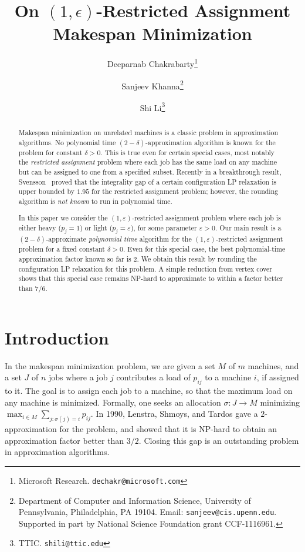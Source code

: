 \documentclass[11pt]{article}
\title{On $(1,\epsilon)$-Restricted Assignment Makespan Minimization}
\author{Deeparnab Chakrabarty\footnote{Microsoft Research. {\tt dechakr@microsoft.com}} \and Sanjeev Khanna\thanks{Department of Computer and Information Science, University of Pennsylvania,
Philadelphia, PA 19104. Email: {\tt sanjeev@cis.upenn.edu}.  Supported in part by National Science Foundation grant CCF-1116961.}  \and Shi Li\footnote{TTIC. {\tt shili@ttic.edu}}}
\newcommand{\eps}{\varepsilon}
\renewcommand{\epsilon}{\varepsilon}
\renewcommand{\epsilon}{\varepsilon}
\begin{document}
\date{}
\maketitle

\begin{abstract}
Makespan minimization on unrelated machines is a classic problem in approximation algorithms. No polynomial time $(2-\delta)$-approximation algorithm is known for the problem for constant $\delta> 0$. This is true even for certain special cases, most notably the {\em restricted assignment} problem where each job has the same load on any machine but can be assigned to one from a specified subset. Recently in a breakthrough result, Svensson~\cite{Sve11} proved that the integrality gap of a certain configuration LP relaxation is upper bounded by $1.95$ for the restricted assignment problem; however, the rounding algorithm is {\em not known} to run in polynomial time.\smallskip

In this paper we consider the $(1,\epsilon)$-restricted assignment problem where each job is either heavy ($p_j = 1$) or light ($p_j = \eps$), for some parameter $\eps > 0$. 
Our main result is a $(2-\delta)$-approximate \emph{polynomial time} algorithm for the $(1,\epsilon)$-restricted assignment problem for a fixed constant $\delta> 0$. Even for this special case, the best polynomial-time approximation factor known so far is $2$. We obtain this result by rounding the configuration LP relaxation for this problem.
A simple reduction from vertex cover shows that this special case remains NP-hard to approximate to within a factor better than $7/6$.
\end{abstract}


\setcounter{page}{0}
\thispagestyle{empty}
\ifdefined\CR

\else
\newpage
\fi

\section{Introduction}

In the makespan minimization problem, we are given a set $M$ of $m$ machines, and a set $J$ of $n$ jobs where a job $j$ contributes a load of $p_{ij}$ to a machine $i$, if assigned to it. The goal is to assign each job to a machine, so that the maximum load on any machine is minimized. Formally, one seeks an allocation $\sigma:J\to M$ minimizing $\max_{i\in M} \sum_{j:\sigma(j)=i} p_{ij}$. In 1990, Lenstra, Shmoys, and Tardos \cite{LST90} gave a $2$-approximation for the problem, and showed that it is NP-hard to obtain an approximation factor better than $3/2$. 
Closing this gap is an outstanding problem in approximation algorithms.
\end{document}
